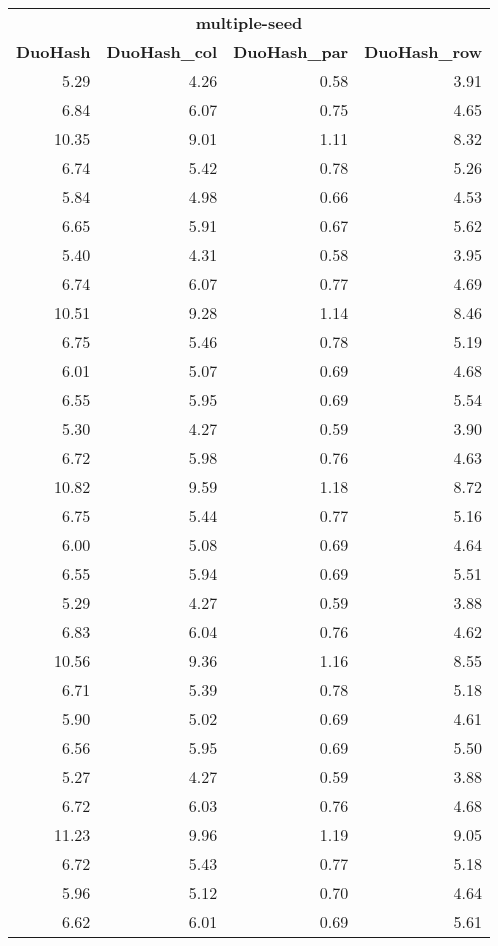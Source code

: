 \section*{\phantom{A}}
\begin{table}[!ht]
	\begin{tabular}{rrrr}
		\multicolumn{4}{c}{\textbf{multiple-seed}} \\
		\textbf{DuoHash} & \textbf{DuoHash\_col} & \textbf{DuoHash\_par} & \textbf{DuoHash\_row} \\
		\toprule
		5.29 & 4.26 & 0.58 & 3.91 \\
		6.84 & 6.07 & 0.75 & 4.65 \\
		10.35 & 9.01 & 1.11 & 8.32 \\
		6.74 & 5.42 & 0.78 & 5.26 \\
		5.84 & 4.98 & 0.66 & 4.53 \\
		6.65 & 5.91 & 0.67 & 5.62 \\
		\midrule
		5.40 & 4.31 & 0.58 & 3.95 \\
		6.74 & 6.07 & 0.77 & 4.69 \\
		10.51 & 9.28 & 1.14 & 8.46 \\
		6.75 & 5.46 & 0.78 & 5.19 \\
		6.01 & 5.07 & 0.69 & 4.68 \\
		6.55 & 5.95 & 0.69 & 5.54 \\
		\midrule
		5.30 & 4.27 & 0.59 & 3.90 \\
		6.72 & 5.98 & 0.76 & 4.63 \\
		10.82 & 9.59 & 1.18 & 8.72 \\
		6.75 & 5.44 & 0.77 & 5.16 \\
		6.00 & 5.08 & 0.69 & 4.64 \\
		6.55 & 5.94 & 0.69 & 5.51 \\
		\midrule
		5.29 & 4.27 & 0.59 & 3.88 \\
		6.83 & 6.04 & 0.76 & 4.62 \\
		10.56 & 9.36 & 1.16 & 8.55 \\
		6.71 & 5.39 & 0.78 & 5.18 \\
		5.90 & 5.02 & 0.69 & 4.61 \\
		6.56 & 5.95 & 0.69 & 5.50 \\
		\midrule
		5.27 & 4.27 & 0.59 & 3.88 \\
		6.72 & 6.03 & 0.76 & 4.68 \\
		11.23 & 9.96 & 1.19 & 9.05 \\
		6.72 & 5.43 & 0.77 & 5.18 \\
		5.96 & 5.12 & 0.70 & 4.64 \\
		6.62 & 6.01 & 0.69 & 5.61 \\
		\bottomrule
	\end{tabular}
\end{table}
\clearpage




